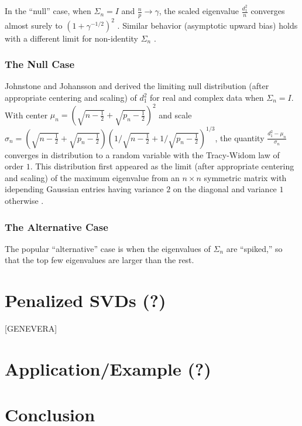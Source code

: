\documentclass{eoeauth}
\begin{document}
In the ``null'' case, when $\Sigma_n = I$ and $\tfrac{n}{p} \to \gamma$,
the scaled eigenvalue $\frac{d_1^2}{n}$ converges almost surely to
$(1 + \gamma^{-1/2})^2$ \cite{geman1980ltn,jonsson1983ole}.  Similar
behavior (asymptotic upward bias) holds with a different limit for
non-identity $\Sigma_n$
\cite{silverstein1984ole,yin1988lle,bai1988nle}. 

\subsubsection{The Null Case}

Johnstone \cite{johnstone2001dle} and Johansson \cite{johansson2000sfa}
and derived the limiting null distribution (after appropriate
centering and scaling) of $d_1^2$ for real and complex data when
$\Sigma_n = I$.  With center
$\mu_n = \left(\sqrt{n-\tfrac{1}{2}} + \sqrt{p_n - \tfrac{1}{2}}\right)^2$ and scale
$\sigma_n = \left(\sqrt{n-\tfrac{1}{2}} + \sqrt{p_n -
    \tfrac{1}{2}}\right) \left(1/\sqrt{n-\tfrac{1}{2}} + 1/\sqrt{p_n -
    \tfrac{1}{2}}\right)^{1/3}$, 
the quantity
\(
\frac{d^2_1 - \mu_n}{\sigma_n}
\)
converges in distribution to a random variable with the Tracy-Widom
law of order $1$.  This distribution first appeared as the limit
(after appropriate centering and scaling) of the maximum eigenvalue
from an $n \times n$ symmetric matrix with idepending Gaussian entries
having variance $2$ on the diagonal and variance $1$ otherwise
\cite{tracy1994lsd, tracy1996oas}.

\subsubsection{The Alternative Case}
 The popular ``alternative'' case is when the eigenvalues of $\Sigma_n$ are
``spiked,'' so that the top few eigenvalues are larger than the rest.



\section{Penalized SVDs (?)}
[GENEVERA]

\section{Application/Example (?)}

\section{Conclusion}



\end{document}
